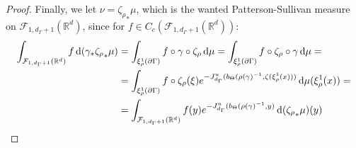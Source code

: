 \documentclass{report}
\begin{document}
\begin{proof}
    Finally, we let $\nu = {\zeta_\rho}_* \mu$, which is the wanted Patterson-Sullivan measure on $\mathcal F_{1, d_\Gamma + 1} (\mathbb R^d)$, since for $f \in C_c(\mathcal F_{1, d_\Gamma + 1} (\mathbb R^d))$:
    \begin{align*}
        \int_{\mathcal F_{1, d_\Gamma + 1} (\mathbb R^d)} f \,\mathrm{d}(\gamma_* {\zeta_\rho}_* \mu) &=
        \int_{\xi_\rho^1(\partial \Gamma)} f \circ \gamma \circ \zeta_\rho \,\mathrm{d} \mu =
        \int_{\xi_\rho^1(\partial \Gamma)} f \circ \zeta_\rho \circ \gamma \,\mathrm{d} \mu =\\
        &=
        \int_{\xi_\rho^1(\partial \Gamma)} f \circ \zeta_\rho(\xi) e^{-J_{d_\Gamma}^u(b_\Theta(\rho(\gamma)^{-1}, \zeta(\xi_\rho^1(x)))} \,\mathrm{d} \mu(\xi_\rho^1(x)) =\\
        &=
        \int_{\mathcal F_{1, d_\Gamma + 1} (\mathbb R^d)} 
        f(y) e^{-J_{d_\Gamma}^u(b_\Theta(\rho(\gamma)^{-1}, y)} \,\mathrm{d} ({\zeta_\rho}_*\mu)(y)
    \end{align*}
\end{proof}

\printbibliography
\end{document}
